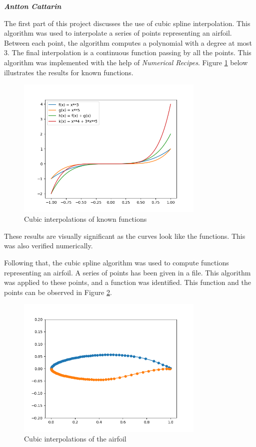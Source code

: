 \large \emph{\textbf{Antton Cattarin}}

The first part of this project discusses the use of cubic spline interpolation. This algorithm was used to interpolate a series of points representing an airfoil. Between each point, the algorithm computes a polynomial with a degree at most 3. The final interpolation is a continuous function passing by all the points. This algorithm was implemented with the help of \emph{Numerical Recipes}. Figure \ref{fig:interp} below illustrates the results for known functions.

\begin{figure}[H]
  \centering
  \includegraphics[width=0.8\textwidth]{img/interpolations.png}
  \caption{Cubic interpolations of known functions}
  \label{fig:interp}
\end{figure}

These results are visually significant as the curves look like the functions. This was also verified numerically.

\bigskip


Following that, the cubic spline algorithm was used to compute functions representing an airfoil. A series of points has been given in a file. This algorithm was applied to these points, and a function was identified. This function and the points can be observed in Figure \ref{fig:airfoil}.

\begin{figure}[H]
  \centering
  \includegraphics[width=0.8\textwidth]{img/airfoil_interp.png}
  \caption{Cubic interpolations of the airfoil}
  \label{fig:airfoil}
\end{figure}
  
